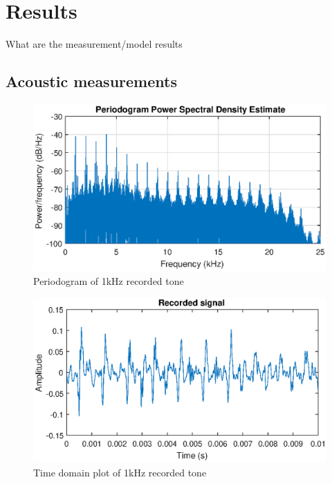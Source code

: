 \chapter{Results}
What are the measurement/model results

\section{Acoustic measurements}

\begin{figure}
    \centering
    \includegraphics[trim={0cm 1.6cm 0cm 2cm},clip,width=\textwidth]{img/Periodogram_1khz-09.eps}
    \caption{Periodogram of 1kHz recorded tone}
    \label{fig:period_1k}
\end{figure}

\begin{figure}
    \centering
    \includegraphics[trim={0cm 1.6cm 0cm 2cm},clip,width=\textwidth]{img/Recorded_1khz-09.eps}
    \caption{Time domain plot of 1kHz recorded tone}
    \label{fig:recorded_1k}
\end{figure}
